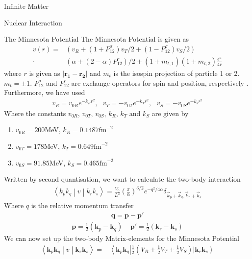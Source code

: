 \documentclass[twoside,english]{uiofysmaster}
\begin{document}
\begin{chapter}{Infinite Matter}
\begin{section}{Nuclear Interaction}
		\begin{subsection}{The Minnesota Potential}
			The Minnesota Potential is given as
			\begin{align}
				v(r) = &\left(v_R + (1 + P_{12}^\sigma) v_T/2 + (1 - P_{12}^\sigma) v_S/2 \right) \\
					   \cdot &\left( \alpha + (2- \alpha)P_{12}^r \right)/2 + (1+m_{t,1})(1+m_{t,2})\frac{e^2}{4r}
			\end{align}
			where $r$ is given as $\left| \mathbf{r_1} - \mathbf{r_2} \right|$ and $m_t$ is the isospin projection of particle 1 or 2. $m_t = \pm 1$. 
			$P_{12}^\sigma $ and $P_{12}^r$ are exchange operators for spin and position, respectively \cite{Baardsen}. Furthermore, we have used
			\begin{align} 
				v_R = v_{0R}e^{-k_R r^2}, \:\:\: v_T = -v_{0T} e^{-k_Tr^2}, \:\:\: v_S = -v_{0S}e^{-k_sr^2}
			\end{align}
			Where the constants $v_{0R}$, $v_{0T}$, $v_{0S}$, $k_R$, $k_T$ and $k_S$ are given by \cite{Thompson1977}
			\begin{enumerate}
				\item $v_{0R} = 200$MeV,  $k_R = 0.1487 \text{fm}^{-2}$
				\item $v_{0T} = 178$MeV,  $k_T = 0.649 \text{fm}^{-2}$
				\item $v_{0S} = 91.85$MeV, $k_S = 0.465 \text{fm}^{-2}$
			\end{enumerate}
			Written by second quantisation, we want to calculate the two-body interaction
			\begin{align}
			 	\left<k_p k_q \middle| v \middle| k_r k_s \right> = \frac{V_0}{L^3} \left(\frac{\pi}{\alpha}\right)^{3/2} e^{-q^2 / 4 \alpha} \delta_{\vec k_p + \vec k_q, \vec k_r + \vec k_s}
			\end{align}
			Where $q$ is the relative momentum transfer
			\begin{align}
				\mathbf{q} = \mathbf{p} - \mathbf{p'} 
			\end{align}
			\begin{align}
				\mathbf{p} = \frac{1}{2} (\mathbf{k}_p - \mathbf{k}_q) \:\:\:\:\: \mathbf{p'} = \frac{1}{2}(\mathbf{k}_r- \mathbf{k}_s) 
			\end{align}
			We can now set up the two-body Matrix-elements for the Minnesota Potential
			\begin{align}
				\left<\mathbf{k}_p \mathbf{k}_q \middle| v \middle| \mathbf{k}_r \mathbf{k}_s \right> = 
				&\left<\mathbf{k}_p \mathbf{k}_q \right| \frac{1}{2} \left( V_R + \frac{1}{2} V_T + \frac{1}{2} V_S \right) \left| \mathbf{k}_r \mathbf{k}_s \right>  \\

\end{align}
\end{subsection}
\end{section}
\end{chapter}
\end{document}

